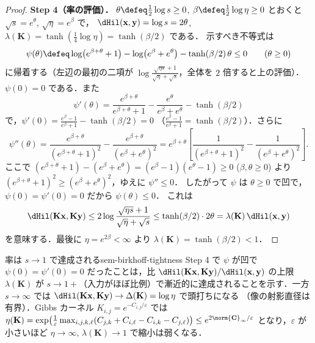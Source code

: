 \begin{proof}
  \textbf{Step 4（率の評価）．}
  $\theta \defeq \tfrac12\log s \geq 0$, $\beta \defeq \tfrac12\log\eta \geq 0$ とおくと
  $\sqrt{s} = e^\theta$, $\sqrt{\eta} = e^\beta$ で，
  $\dHil(\mathbf{x}, \mathbf{y}) = \log s = 2\theta$,
  $\lambda(\mathbf{K}) = \tanh(\tfrac14\log\eta) = \tanh(\beta/2)$ である．
  示すべき不等式は
  \[
    \psi(\theta) \defeq
    \log\bigl(e^{\beta+\theta} + 1\bigr) - \log\bigl(e^\beta + e^\theta\bigr)
    - \tanh(\beta/2)\,\theta \leq 0
    \qquad (\theta \geq 0)
  \]
  に帰着する（左辺の最初の二項が
  $\log\frac{\sqrt{\eta s}+1}{\sqrt\eta+\sqrt s}$，全体を $2$ 倍すると上の評価）．
  $\psi(0) = 0$ である．また
  \[
    \psi'(\theta)
    = \frac{e^{\beta+\theta}}{e^{\beta+\theta}+1}
    - \frac{e^\theta}{e^\beta + e^\theta}
    - \tanh(\beta/2)
  \]
  で，$\psi'(0) = \frac{e^\beta - 1}{e^\beta + 1} - \tanh(\beta/2) = 0$
  （$\frac{e^\beta-1}{e^\beta+1} = \tanh(\beta/2)$）．さらに
  \[
    \psi''(\theta)
    = \frac{e^{\beta+\theta}}{(e^{\beta+\theta}+1)^2}
    - \frac{e^{\beta+\theta}}{(e^\beta + e^\theta)^2}
    = e^{\beta+\theta}\left[\frac{1}{(e^{\beta+\theta}+1)^2} - \frac{1}{(e^\beta+e^\theta)^2}\right].
  \]
  ここで
  $(e^{\beta+\theta} + 1) - (e^\beta + e^\theta) = (e^\beta - 1)(e^\theta - 1) \geq 0$
  ($\beta, \theta \geq 0$) より $(e^{\beta+\theta}+1)^2 \geq (e^\beta + e^\theta)^2$，ゆえに $\psi'' \leq 0$．
  したがって $\psi$ は $\theta \geq 0$ で凹で，$\psi(0) = \psi'(0) = 0$ だから $\psi(\theta) \leq 0$．
  これは
  \[
    \dHil(\mathbf{K}\mathbf{x}, \mathbf{K}\mathbf{y})
    \leq 2\log\frac{\sqrt{\eta s}+1}{\sqrt\eta+\sqrt s}
    \leq \tanh(\beta/2)\cdot 2\theta
    = \lambda(\mathbf{K})\,\dHil(\mathbf{x}, \mathbf{y})
  \]
  を意味する．最後に $\eta = e^{2\beta} < \infty$ より $\lambda(\mathbf{K}) = \tanh(\beta/2) < 1$．
\end{proof}

\begin{remark}{率は $s\to1$ で達成される}{sem-birkhoff-tightness}
  Step 4 で $\psi$ が凹で $\psi(0)=\psi'(0)=0$ だったことは，比
  $\dHil(\mathbf{K}\mathbf{x},\mathbf{K}\mathbf{y})/\dHil(\mathbf{x},\mathbf{y})$ の上限 $\lambda(\mathbf{K})$ が
  $s \to 1+$（入力がほぼ比例）で漸近的に達成されることを示す．一方 $s \to \infty$ では
  $\dHil(\mathbf{K}\mathbf{x},\mathbf{K}\mathbf{y}) \to \Delta(\mathbf{K}) = \log\eta$ で頭打ちになる
  （像の射影直径は有界）．Gibbs カーネル $K_{i,j} = e^{-C_{i,j}/\varepsilon}$ では
  $\eta(\mathbf{K}) = \exp\bigl(\tfrac{1}{\varepsilon}\max_{i,j,k,\ell}(C_{j,k}+C_{i,\ell}-C_{i,k}-C_{j,\ell})\bigr)
  \leq e^{2\norm{\mathbf{C}}_\infty/\varepsilon}$ となり，$\varepsilon$ が小さいほど
  $\eta \to \infty$, $\lambda(\mathbf{K}) \to 1$ で縮小は弱くなる．
\end{remark}

